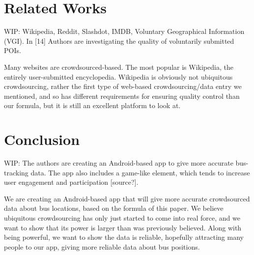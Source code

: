 \documentclass[9pt,twocolumn]{article}
\begin{document}
	\section*{Related Works}
	WIP: Wikipedia, Reddit, Slashdot, IMDB, Voluntary Geographical Information (VGI). In [14] Authors are investigating the quality of voluntarily submitted POIs.
	
	Many websites are crowdsourced-based. The most popular is Wikipedia, the entirely user-submitted encyclopedia. Wikipedia is obviously not ubiquitous crowdsourcing, rather the first type of web-based crowdsourcing/data entry we mentioned, and so has different requirements for ensuring quality control than our formula, but it is still an excellent platform to look at.
	
	
	
	
	\section*{Conclusion}
	WIP: The authors are creating an Android-based app to give more accurate bus-tracking data. The app also includes a game-like element, which tends to increase user engagement and participation [source?]. 
	
	We are creating an Android-based app that will give more accurate crowdsourced data about bus locations, based on the formula of this paper. We believe ubiquitous crowdsourcing has only just started to come into real force, and we want to show that its power is larger than was previously believed. Along with being powerful, we want to show the data is reliable, hopefully attracting many people to our app, giving more reliable data about bus positions. 
	
	
\end{document}
